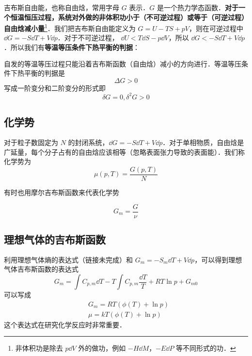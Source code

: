 

吉布斯自由能，也称自由焓，常用字母 $G$ 表示．$G$ 是一个热力学态函数．\textbf{对于一个恒温恒压过程，系统对外做的非体积功小于（不可逆过程）或等于（可逆过程）自由焓减小量}\footnote{非体积功是除去 $p\dd V$ 外的做功，例如 $-H\dd M$，$-E\dd P$ 等不同形式的功．}．我们把吉布斯自由能定义为 $G=U-TS+pV$，则在可逆过程中 $\dd G= -S\dd T+V\dd p$．对于不可逆过程， $\dd U<T\dd S-p\dd V$，所以 $\dd G<-S\dd T+V\dd p$．所以我们有\textbf{等温等压条件下热平衡的判据}：

自发的等温等压过程只能沿着吉布斯函数（自由焓）减小的方向进行．等温等压条件下热平衡的判据是
\begin{equation}
\Delta G>0
\end{equation}
写成一阶变分和二阶变分的形式即
\begin{equation}
\delta G=0,\delta^2 G>0
\end{equation}

\subsection{化学势}

对于粒子数固定为 $N$ 的封闭系统，$\dd G=-S\dd T+V\dd p$．对于单相物质，自由焓是广延量，每个分子占有的自由焓应该相等（忽略表面张力导致的表面能）．我们称化学势为
\begin{equation}
\mu(p,T)=\frac{G(p,T)}{N}
\end{equation}

有时也用摩尔吉布斯函数来代表化学势

\begin{equation}
G_m=\frac{G}{\nu}
\end{equation}

\subsection{理想气体的吉布斯函数}
利用理想气体熵的表达式（链接未完成）和 $G_m=-S_m\dd T+V\dd p$，可以得到理想气体吉布斯函数的表达式
\begin{equation}
G_m=\int C_{p,m} \dd T - T\int C_{p,m} \frac{\dd T}{T}+RT\ln p+G_{m0}
\end{equation}
可以写成
\begin{align}
&G_m=RT(\phi(T)+\ln p)\\
&\mu = kT(\phi(T)+\ln p)
\end{align}
这个表达式在研究化学反应时非常重要．